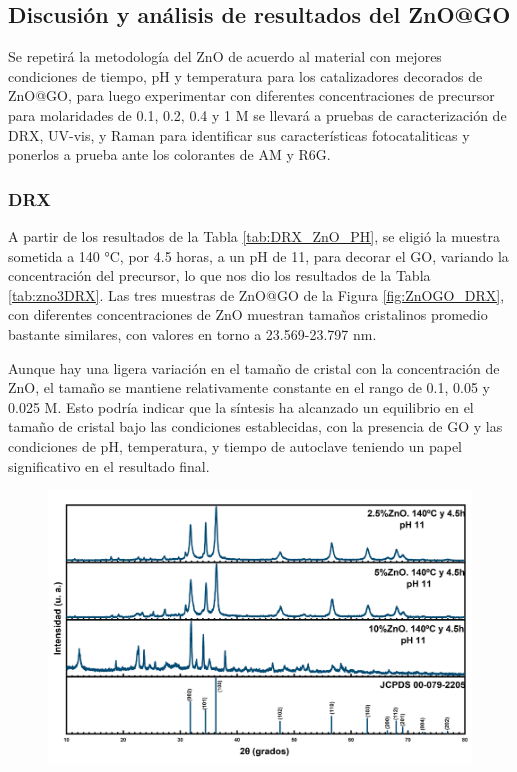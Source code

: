 \documentclass[12pt]{article}
\begin{document}
\subsection{Discusión y análisis de resultados del ZnO@GO}      
Se repetirá la metodología del ZnO de acuerdo al material con mejores condiciones de tiempo, pH y temperatura para los catalizadores decorados de ZnO@GO, para luego experimentar con diferentes concentraciones de precursor para molaridades de 0.1, 0.2, 0.4 y 1 M se llevará a pruebas de caracterización de DRX, UV-vis, y Raman para identificar sus características fotocataliticas y ponerlos a prueba ante los colorantes de AM y R6G.
 \subsubsection{DRX}

A partir de los resultados de la Tabla \ref{tab:DRX_ZnO_PH}, se eligió la muestra sometida a 140 °C, por 4.5 horas, a un pH de 11, para decorar el GO, variando la concentración del precursor, lo que nos dio los resultados de la Tabla \ref{tab:zno3DRX}.
Las tres muestras de ZnO@GO de la Figura \ref{fig:ZnOGO_DRX}, con diferentes concentraciones de ZnO muestran tamaños cristalinos promedio bastante similares, con valores en torno a 23.569-23.797 nm.\vspace{1em} %

Aunque hay una ligera variación en el tamaño de cristal con la concentración de ZnO, el tamaño se mantiene relativamente constante en el rango de 0.1, 0.05 y 0.025 M. Esto podría indicar que la síntesis ha alcanzado un equilibrio en el tamaño de cristal bajo las condiciones establecidas, con la presencia de GO y las condiciones de pH, temperatura, y tiempo de autoclave teniendo un papel significativo en el resultado final.


\begin{figure}[H]
    	   \begin{center}
     	  	\includegraphics[width = 1\textwidth]{Imagenes/ZnO_GO.png}
    	   \end{center} 
        \end{figure}
\end{document}

